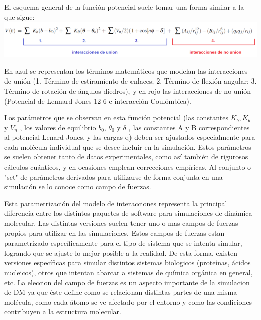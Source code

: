 \documentclass[a4paper,10pt]{report}
\begin{document}
El esquema general de la función potencial suele tomar una forma similar a la que sigue: \\
\includegraphics[keepaspectratio, width=1.0\textwidth]{img/ecPotencialAmber.png}
\vspace{2pt}

En azul se representan los términos matemáticos que modelan las interacciones de unión (1. Término de estiramiento de enlaces; 2. Término de flexión angular; 3. Término de rotación de ángulos diedros), y en rojo
las interacciones de no unión (Potencial de Lennard-Jones 12-6 e interacción Coulómbica).

Los parámetros que se observan en esta función potencial (las constantes $K_b, K_{\theta}$ y $V_n$ , los valores de equilibrio $b_0$, $\theta_0$ y $\delta$ , 
las constantes A y B correspondientes al potencial Lenard-Jones, y las cargas q) deben ser ajustados especialmente para cada molécula individual que se desee incluir en la 
simulación. Estos parámetros se suelen obtener tanto de datos experimentales, como así también de rigurosos cálculos cuánticos, y en ocasiones emplean correcciones empíricas.
Al conjunto o "set" de parámetros derivados para utilizarse de forma conjunta en una simulación se lo conoce como campo de fuerzas.

Esta parametrización del modelo de interacciones representa la principal diferencia entre los distintos paquetes de software para simulaciones de dinámica molecular. 
Las distintas versiones suelen tener uno o mas campos de fuerzas propios para utilizar en las simulaciones. 
Estos campos de fuerzas estan parametrizado específicamente para el tipo de sistema que se intenta simular, logrando que se ajuste lo mejor posible a la realidad.
De esta forma, existen versiones específicas para simular distintos sistemas biologicos (proteínas, ácidos nucleicos), otros que intentan abarcar a sistemas de química orgánica en general, etc.
La eleccion del campo de fuerzas es un aspecto importante de la simulacion de DM ya que éste define como se relacionan distintas partes de una misma molécula, como cada átomo se ve afectado por el entorno y como las condiciones contribuyen a la estructura molecular. 
\end{document}
